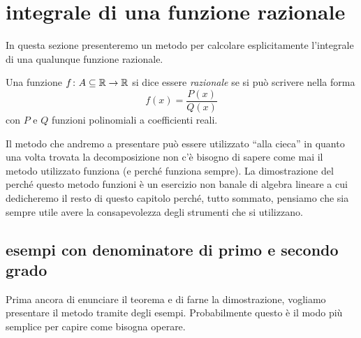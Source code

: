\section{integrale di una funzione razionale}
%
In questa sezione presenteremo un metodo per
calcolare esplicitamente l'integrale di una qualunque funzione razionale.
%
%

\begin{definition}
%
%
%
Una funzione $f\colon A \subseteq {\mathbb R} \to {\mathbb R}$
si dice essere \emph{razionale} se si può scrivere nella forma
\[
  f(x) = \frac{P(x)}{Q(x)}
\]
con $P$ e $Q$ funzioni polinomiali a coefficienti reali.
\end{definition}

Il metodo che andremo a presentare può essere utilizzato ``alla cieca'' in
quanto una volta trovata la decomposizione non c'è bisogno di sapere
come mai il metodo utilizzato funziona (e perché funziona sempre).
La dimostrazione del perché questo metodo funzioni è un esercizio non
banale di algebra lineare a cui dedicheremo il resto di questo capitolo
perché, tutto sommato, pensiamo che sia sempre utile avere la consapevolezza degli strumenti che si utilizzano.

\subsection{esempi con denominatore di primo e secondo grado}

Prima ancora di enunciare il teorema e di farne la dimostrazione,
vogliamo presentare il metodo tramite degli esempi. 
Probabilmente questo è il modo più semplice per capire come bisogna operare.

